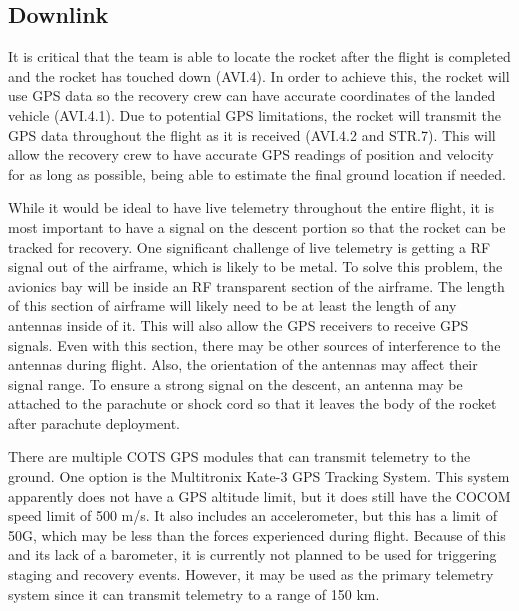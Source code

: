 \subsection{Downlink}
It is critical that the team is able to locate the rocket after the flight is completed and the rocket has touched down (AVI.4). In order to achieve this, the rocket will use GPS data so the recovery crew can have accurate coordinates of the landed vehicle (AVI.4.1). Due to potential GPS limitations, the rocket will transmit the GPS data throughout the flight as it is received (AVI.4.2 and STR.7). This will allow the recovery crew to have accurate GPS readings of position and velocity for as long as possible, being able to estimate the final ground location if needed.

While it would be ideal to have live telemetry throughout the entire flight, it is most important to have a signal on the descent portion so that the rocket can be tracked for recovery. One significant challenge of live telemetry is getting a RF signal out of the airframe, which is likely to be metal. To solve this problem, the avionics bay will be inside an RF transparent section of the airframe. The length of this section of airframe will likely need to be at least the length of any antennas inside of it. This will also allow the GPS receivers to receive GPS signals. Even with this section, there may be other sources of interference to the antennas during flight. Also, the orientation of the antennas may affect their signal range. To ensure a strong signal on the descent, an antenna may be attached to the parachute or shock cord so that it leaves the body of the rocket after parachute deployment.

There are multiple COTS GPS modules that can transmit telemetry to the ground. One option is the Multitronix Kate-3 GPS Tracking System. This system apparently does not have a GPS altitude limit, but it does still have the COCOM speed limit of 500 m/s. It also includes an accelerometer, but this has a limit of 50G, which may be less than the forces experienced during flight. Because of this and its lack of a barometer, it is currently not planned to be used for triggering staging and recovery events. However, it may be used as the primary telemetry system since it can transmit telemetry to a range of 150 km.

